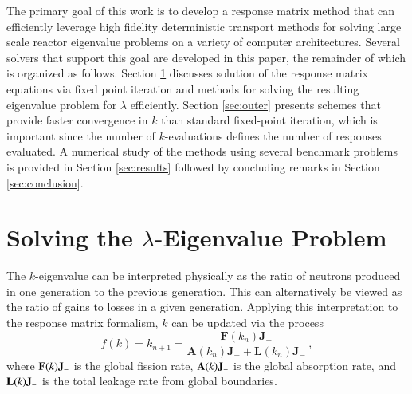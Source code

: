 The primary goal of this work is to develop a response matrix method that
can efficiently leverage high fidelity deterministic transport methods for 
solving large scale reactor eigenvalue problems on a variety of computer 
architectures.  
Several solvers that support this goal are developed in this paper, 
the remainder of which is organized as follows.
 Section \ref{sec:inner}
discusses solution of the response matrix equations via fixed point 
iteration and methods for solving the resulting eigenvalue problem 
for $\lambda$ efficiently.  Section \ref{sec:outer} presents schemes 
that provide faster convergence in $k$ than standard fixed-point iteration,
which is important since the number of $k$-evaluations defines the 
number of responses evaluated.  A numerical study 
of the methods using several benchmark problems is 
provided in Section \ref{sec:results} followed by concluding remarks in
Section \ref{sec:conclusion}.


\section{Solving the $\lambda$-Eigenvalue Problem}
\label{sec:inner}

The $k$-eigenvalue can be interpreted physically as the ratio of neutrons
produced in one generation to the previous generation.  This can 
alternatively be viewed as the ratio of gains to losses in a given 
generation. Applying this interpretation to the response matrix formalism, 
 $k$ can be updated via the process
\begin{equation}
 f(k) = k_{n+1} = \frac{\mathbf{F}(k_{n})\mathbf{J}_{-}} 
    { \mathbf{A}(k_{n}) \mathbf{J}_{-} + \mathbf{L}(k_{n}) \mathbf{J}_{-} }\, ,
\label{eq:picard}
\end{equation}
where $\mathbf{F}(k)\mathbf{J}_{-}$ is the global fission rate, 
$\mathbf{A}(k) \mathbf{J}_{-}$ is the global absorption rate,
and $\mathbf{L}(k) \mathbf{J}_{-}$ is the total leakage rate
from global boundaries.

